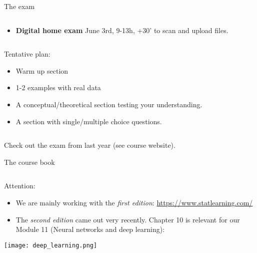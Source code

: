 \documentclass[10pt,ignorenonframetext,]{beamer}
\providecommand{\tightlist}{%
  \setlength{\itemsep}{0pt}\setlength{\parskip}{0pt}}
\begin{document}
\begin{frame}{The exam}
\protect\hypertarget{the-exam}{}

\(~\)

\begin{itemize}
\tightlist
\item
  \textbf{Digital home exam} June 3rd, 9-13h, +30' to scan and upload
  files.
\end{itemize}

\(~\)

Tentative plan:

\begin{itemize}
\tightlist
\item
  Warm up section
\item
  1-2 examples with real data
\item
  A conceptual/theoretical section testing your understanding.
\item
  A section with single/multiple choice questions.
\end{itemize}

\(~\)

Check out the exam from last year (see course website).

\end{frame}

\begin{frame}{The course book}
\protect\hypertarget{the-course-book}{}

\(~\)

Attention:

\begin{itemize}
\item
  We are mainly working with the \emph{first edition}:
  \url{https://www.statlearning.com/}
\item
  The \emph{second edition} came out very recently. Chapter 10 is
  relevant for our Module 11 (Neural networks and deep learning):
\end{itemize}

\centering

\texttt{[image: deep\_learning.png]}

\end{frame}
\end{document}
